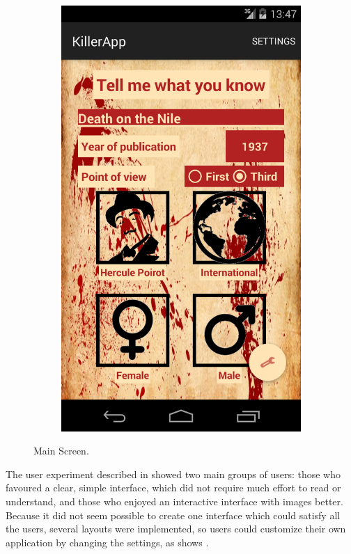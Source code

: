 \documentclass{mproj}
\begin{document}
\begin{figure}[h]
\begin{subfigure}{0.4\linewidth}
			\includegraphics[width=\linewidth]{images/image_input}
		\end{subfigure}
		\caption{Main Screen.}
		\label{fig:main_screen}
	\endminipage
\end{figure}
The user experiment described in  showed two main groups of users: those who favoured a clear, simple interface, which did not require much effort to read or understand, and those who enjoyed an interactive interface with images better. Because it did not seem possible to create one interface which could satisfy all the users, several layouts were implemented, so users could customize their own application by changing the settings, as shows .
\end{document}
